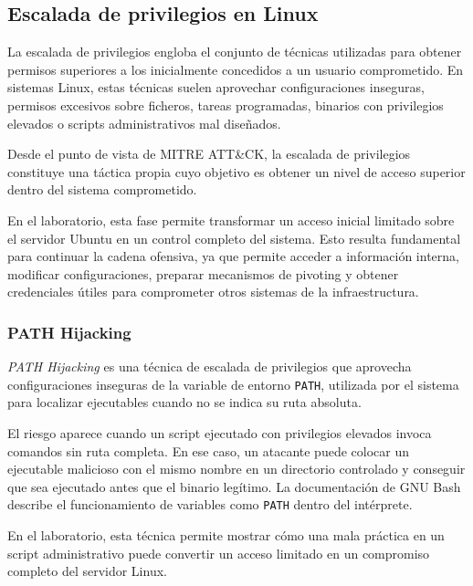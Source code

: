 
\subsection{Escalada de privilegios en Linux}

La escalada de privilegios engloba el conjunto de técnicas utilizadas para obtener permisos superiores a los inicialmente concedidos a un usuario comprometido. En sistemas Linux, estas técnicas suelen aprovechar configuraciones inseguras, permisos excesivos sobre ficheros, tareas programadas, binarios con privilegios elevados o scripts administrativos mal diseñados.

Desde el punto de vista de MITRE ATT\&CK, la escalada de privilegios constituye una táctica propia cuyo objetivo es obtener un nivel de acceso superior dentro del sistema comprometido.

En el laboratorio, esta fase permite transformar un acceso inicial limitado sobre el servidor Ubuntu en un control completo del sistema. Esto resulta fundamental para continuar la cadena ofensiva, ya que permite acceder a información interna, modificar configuraciones, preparar mecanismos de pivoting y obtener credenciales útiles para comprometer otros sistemas de la infraestructura.


\subsubsection{PATH Hijacking}

\textit{PATH Hijacking} es una técnica de escalada de privilegios que aprovecha configuraciones inseguras de la variable de entorno \texttt{PATH}, utilizada por el sistema para localizar ejecutables cuando no se indica su ruta absoluta.

El riesgo aparece cuando un script ejecutado con privilegios elevados invoca comandos sin ruta completa. En ese caso, un atacante puede colocar un ejecutable malicioso con el mismo nombre en un directorio controlado y conseguir que sea ejecutado antes que el binario legítimo. La documentación de GNU Bash describe el funcionamiento de variables como \texttt{PATH} dentro del intérprete.

En el laboratorio, esta técnica permite mostrar cómo una mala práctica en un script administrativo puede convertir un acceso limitado en un compromiso completo del servidor Linux.

